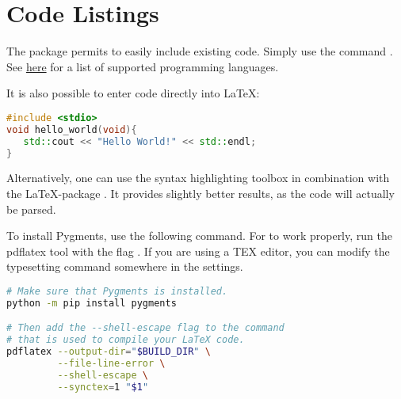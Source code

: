 

\chapter{Code Listings}

\label{Chapter2} %


The package \href{https://www.overleaf.com/learn/latex/Code\_listing}{} permits to easily include existing code. Simply use the command \verb||. See \href{https://www.overleaf.com/learn/latex/Code\_listing#Supported\_languages}{here} for a list of supported programming languages.




It is also possible to enter code directly into \LaTeX:

\begin{lstlisting}[language=C++]
#include <stdio>
void hello_world(void){
   std::cout << "Hello World!" << std::endl;
}    
\end{lstlisting}

Alternatively, one can use the syntax highlighting toolbox \href{https://pygments.org/}{} in combination with the \LaTeX-package \href{www.overleaf.com/learn/latex/Code\_Highlighting\_with\_minted}{}. It provides slightly better results, as the code will actually be parsed.

To install Pygments, use the following command. For  to work properly, run the pdflatex tool with the flag . If you are using a TEX editor, you can modify the typesetting   command somewhere in the settings.

\begin{lstlisting}[language=bash]
# Make sure that Pygments is installed.
python -m pip install pygments

# Then add the --shell-escape flag to the command 
# that is used to compile your LaTeX code.
pdflatex --output-dir="$BUILD_DIR" \
         --file-line-error \
         --shell-escape \
         --synctex=1 "$1"
\end{lstlisting}



